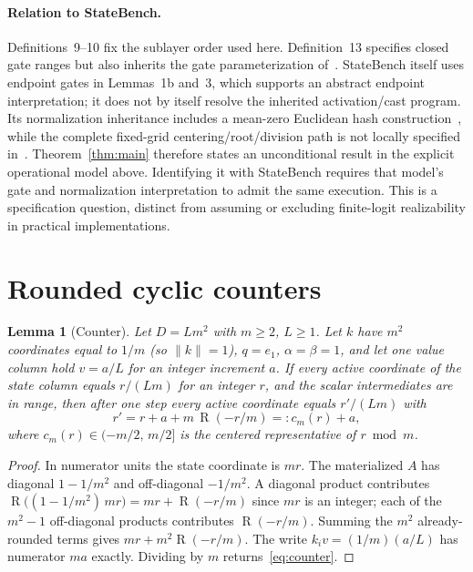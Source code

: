 \documentclass[10pt]{article}
\newtheorem{lemma}{Lemma}
\theoremstyle{remark}
\DeclareMathOperator{\R}{R}
\begin{document}
\paragraph{Relation to StateBench.}
Definitions~9--10 fix the sublayer order used here. Definition~13 specifies closed
gate ranges but also inherits the gate parameterization of~\citet{gdn}.
StateBench itself uses endpoint gates in Lemmas~1b and~3, which supports an
abstract endpoint interpretation; it does not by itself resolve the inherited
activation/cast program. Its normalization inheritance includes a mean-zero
Euclidean hash construction~\citep[Appendix~C]{norm}, while the complete
fixed-grid centering/root/division path is not locally specified
in~\citet{merrill2026,li,statebench}. Theorem~\ref{thm:main} therefore states an
unconditional result in the explicit operational model above. Identifying it
with StateBench requires that model's gate and normalization interpretation to
admit the same execution. This is a specification question, distinct from
assuming or excluding finite-logit realizability in practical implementations.

\section{Rounded cyclic counters}\label{sec:counter}

\begin{lemma}[Counter]\label{lem:counter}
Let $D=Lm^2$ with $m\ge2$, $L\ge1$. Let $k$ have $m^2$ coordinates equal to $1/m$ (so $\|k\|=1$), $q=e_1$, $\alpha=\beta=1$, and let one value column hold $v=a/L$ for an integer increment $a$. If every active coordinate of the state column equals $r/(Lm)$ for an integer $r$, and the scalar intermediates are in range, then after one step every active coordinate equals $r'/(Lm)$ with
\begin{equation}\label{eq:counter}
r'=r+a+m\,\R(-r/m)=:c_m(r)+a,
\end{equation}
where $c_m(r)\in(-m/2,\,m/2]$ is the centered representative of $r\bmod m$.
\end{lemma}
\begin{proof}
In numerator units the state coordinate is $mr$. The materialized $A$ has diagonal $1-1/m^2$ and off-diagonal $-1/m^2$. A diagonal product contributes $\R\big((1-1/m^2)\,mr\big)=mr+\R(-r/m)$ since $mr$ is an integer; each of the $m^2-1$ off-diagonal products contributes $\R(-r/m)$. Summing the $m^2$ already-rounded terms gives $mr+m^2\R(-r/m)$. The write $k_iv=(1/m)(a/L)$ has numerator $ma$ exactly. Dividing by $m$ returns~\eqref{eq:counter}.
\end{proof}
\end{document}
